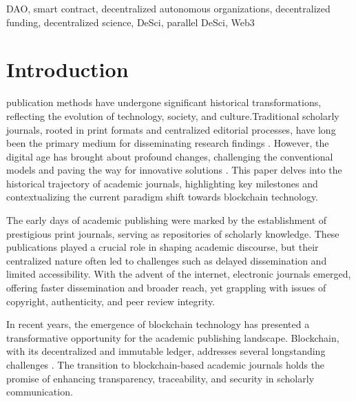 \documentclass[lettersize,journal]{IEEEtran}
\begin{document}
\begin{IEEEkeywords}
DAO, smart contract, decentralized autonomous organizations, decentralized funding, decentralized science, DeSci, parallel DeSci, Web3
\end{IEEEkeywords}

\section{Introduction}

 publication methods have undergone significant historical transformations, reflecting the evolution of technology, society, and culture.Traditional scholarly journals, rooted in print formats and centralized editorial processes, have long been the primary medium for disseminating research findings \cite{febvre1997coming}. However, the digital age has brought about profound changes, challenging the conventional models and paving the way for innovative solutions \cite{meadows1997communicating}. This paper delves into the historical trajectory of academic journals, highlighting key milestones and contextualizing the current paradigm shift towards blockchain technology.

The early days of academic publishing were marked by the establishment of prestigious print journals, serving as repositories of scholarly knowledge. These publications played a crucial role in shaping academic discourse, but their centralized nature often led to challenges such as delayed dissemination and limited accessibility. With the advent of the internet, electronic journals emerged, offering faster dissemination and broader reach, yet grappling with issues of copyright, authenticity, and peer review integrity.

In recent years, the emergence of blockchain technology has presented a transformative opportunity for the academic publishing landscape. Blockchain, with its decentralized and immutable ledger, addresses several longstanding challenges \cite{swan2015blockchain}. The transition to blockchain-based academic journals holds the promise of enhancing transparency, traceability, and security in scholarly communication.
\end{document}
